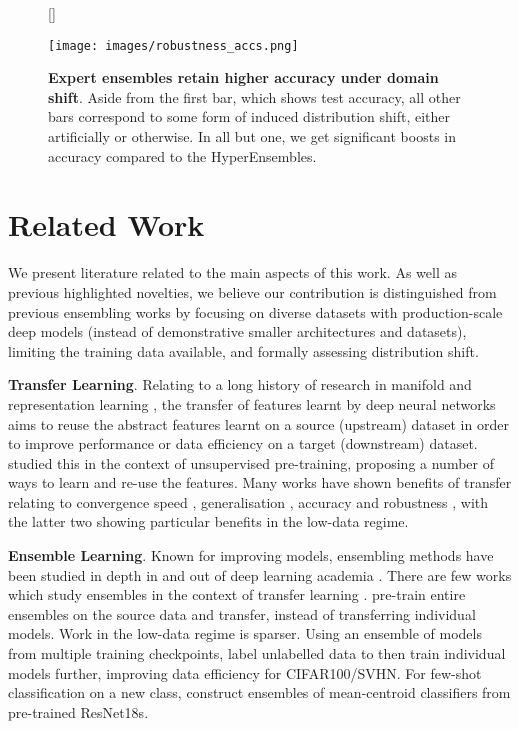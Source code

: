 \documentclass{article} \usepackage{iclr2021_conference,times}
\begin{document}
\begin{figure}
[\FBwidth]
{\caption{\textbf{Expert ensembles retain higher accuracy under domain shift}. Aside from the first bar, which shows test accuracy, all other bars correspond to some form of induced distribution shift, either artificially or otherwise. In all but one, we get significant boosts in accuracy compared to the HyperEnsembles.}\label{fig:robustness}}
{\texttt{[image: images/robustness\_accs.png]}}
\end{figure}


 \section{Related Work}  \label{sec:literature}

We present literature related to the main aspects of this work. As well as previous highlighted novelties, we believe our contribution is distinguished from previous ensembling works by focusing on diverse datasets with production-scale deep models (instead of demonstrative smaller architectures and datasets), limiting the training data available, and formally assessing distribution shift.







\textbf{Transfer Learning}.
Relating to a long history of research in manifold and representation learning \citep{chuanqi2018deeptransferlearning}, the transfer of features learnt by deep neural networks aims to reuse the abstract features learnt on a source (upstream) dataset in order to improve performance or data efficiency on a target (downstream) dataset. \citet{bengio2012transfer} studied this in the context of unsupervised pre-training, proposing a number of ways to learn and re-use the features. Many works have shown benefits of transfer relating to convergence speed \citep{raghu2019transfusion}, generalisation \citep{yosinski2014transferable}, accuracy \citep{zhai2019largescale} and robustness \citep{djolonga2020robustness}, with the latter two showing particular benefits in the low-data regime. 

\textbf{Ensemble Learning}.
Known for improving models, ensembling methods have been studied in depth in and out of deep learning academia \citep{seni2010ensemble}.
There are few works which study ensembles in the context of transfer learning \citep{acharya2012transfer, shiliang2013parts}.
\citet{bachman2014pseudo} pre-train entire ensembles on the source data and transfer, instead of transferring individual models.
Work in the low-data regime is sparser. Using an ensemble of models from multiple training checkpoints, \citet{laine2017ssl} label unlabelled data to then train individual models further, improving data efficiency for CIFAR100/SVHN. For few-shot classification on a new class, \citet{dvornik2019fewshot} construct ensembles of mean-centroid classifiers from pre-trained ResNet18s.
\end{document}
